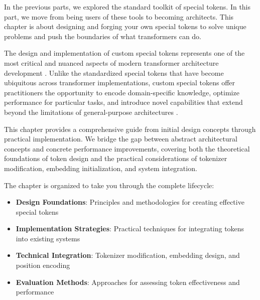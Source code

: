 
In the previous parts, we explored the standard toolkit of special tokens. In this part, we move from being users of these tools to becoming architects. This chapter is about designing and forging your own special tokens to solve unique problems and push the boundaries of what transformers can do.

The design and implementation of custom special tokens represents one of the most critical and nuanced aspects of modern transformer architecture development \citep{vaswani2017attention, devlin2018bert}. Unlike the standardized special tokens that have become ubiquitous across transformer implementations, custom special tokens offer practitioners the opportunity to encode domain-specific knowledge, optimize performance for particular tasks, and introduce novel capabilities that extend beyond the limitations of general-purpose architectures \citep{kenton2019bert, liu2019roberta}.

This chapter provides a comprehensive guide from initial design concepts through practical implementation. We bridge the gap between abstract architectural concepts and concrete performance improvements, covering both the theoretical foundations of token design and the practical considerations of tokenizer modification, embedding initialization, and system integration.

\begin{comment}
Feedback: This is a great opening. To make it even more exciting for the reader, you could frame it as moving from a user to a creator. For example: "In the previous parts, we explored the standard toolkit of special tokens. In this part, we move from being users of these tools to becoming architects. This chapter is about designing and forging your own special tokens to solve unique problems and push the boundaries of what transformers can do."

STATUS: addressed - integrated the suggested framing into the updated introduction
\end{comment}

The chapter is organized to take you through the complete lifecycle:
\begin{itemize}
\item \textbf{Design Foundations}: Principles and methodologies for creating effective special tokens
\item \textbf{Implementation Strategies}: Practical techniques for integrating tokens into existing systems
\item \textbf{Technical Integration}: Tokenizer modification, embedding design, and position encoding
\item \textbf{Evaluation Methods}: Approaches for assessing token effectiveness and performance
\end{itemize}

